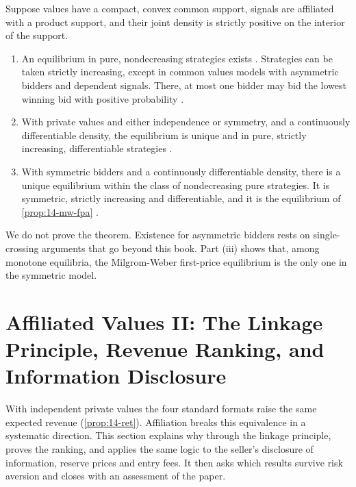 \begin{theorem}\label{thm:14-existence}
Suppose values have a compact, convex common support, signals are affiliated with a product support, and
their joint density is strictly positive on the interior of the support.
\begin{enumerate}[label=(\roman*)]
  \item An equilibrium in pure, nondecreasing strategies exists \citep{Athey2001,RenyZamir2004}. Strategies
  can be taken strictly increasing, except in common values models with asymmetric bidders and dependent
  signals. There, at most one bidder may bid the lowest winning bid with positive probability
  \citep{McAdams2003}.
  \item With private values and either independence or symmetry, and a continuously differentiable density,
  the equilibrium is unique and in pure, strictly increasing, differentiable strategies
  \citep{Lebrun1999,MaskinRiley2003,McAdams2003,McAdams2007}.
  \item With symmetric bidders and a continuously differentiable density, there is a unique equilibrium
  within the class of nondecreasing pure strategies. It is symmetric, strictly increasing and differentiable,
  and it is the equilibrium of \cref{prop:14-mw-fpa} \citep{McAdams2007}.
\end{enumerate}
\end{theorem}

We do not prove the theorem. Existence for asymmetric bidders rests on single-crossing arguments that go
beyond this book. Part (iii) shows that, among monotone equilibria, the Milgrom-Weber first-price
equilibrium is the only one in the symmetric model.

\section{Affiliated Values II: The Linkage Principle, Revenue Ranking, and Information Disclosure}\label{sec:14-mw-rank}

With independent private values the four standard formats raise the same expected revenue
(\cref{prop:14-ret}). Affiliation breaks this equivalence in a systematic direction. This section explains why
through the linkage principle, proves the ranking, and applies the same logic to the seller's disclosure of
information, reserve prices and entry fees. It then asks which results survive risk aversion and closes with
an assessment of the paper.

